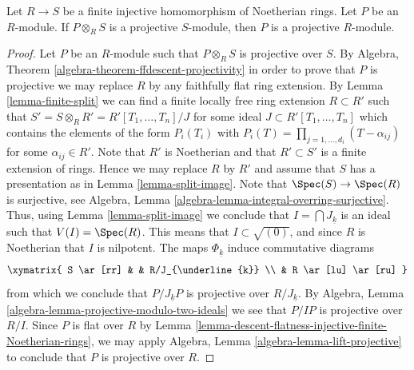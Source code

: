 \begin{lemma}
\label{lemma-descent-projective-injective-finite-Noetherian-rings}
Let $R \to S$ be a finite injective homomorphism of Noetherian rings.
Let $P$ be an $R$-module. If $P \otimes_R S$ is a projective $S$-module,
then $P$ is a projective $R$-module.
\end{lemma}

\begin{proof}
Let $P$ be an $R$-module such that $P \otimes_R S$ is projective over $S$. By
Algebra, Theorem \ref{algebra-theorem-ffdescent-projectivity}
in order to prove that $P$ is projective we may replace $R$
by any faithfully flat ring extension. By
Lemma \ref{lemma-finite-split}
we can find a finite locally free ring extension $R \subset R'$ such
that $S' = S \otimes_R R' = R'[T_1, \ldots, T_n]/J$ for some ideal
$J \subset R'[T_1, \ldots, T_n]$ which contains the  elements of the form
$P_i(T_i)$ with $P_i(T) = \prod_{j = 1, \ldots, d_i} (T - \alpha_{ij})$
for some $\alpha_{ij} \in R'$. Note that $R'$ is Noetherian
and that $R' \subset S'$ is a finite extension of rings. Hence we may
replace $R$ by $R'$ and assume that $S$ has a presentation as in
Lemma \ref{lemma-split-image}.
Note that $\Spec(S) \to \Spec(R)$ is surjective, see
Algebra, Lemma \ref{algebra-lemma-integral-overring-surjective}.
Thus, using Lemma \ref{lemma-split-image}
we conclude that $I = \bigcap J_{\underline{k}}$ is an ideal
such that $V(I) = \Spec(R)$. This means that
$I \subset \sqrt{(0)}$, and since $R$ is Noetherian that $I$
is nilpotent. The maps $\Phi_{\underline{k}}$ induce commutative
diagrams
$$
\xymatrix{
S \ar[rr] & & R/J_{\underline{k}} \\
& R \ar[lu] \ar[ru]
}
$$
from which we conclude that $P/J_{\underline{k}}P$ is projective over
$R/J_{\underline{k}}$. By
Algebra, Lemma \ref{algebra-lemma-projective-modulo-two-ideals}
we see that $P/IP$ is projective over $R/I$. Since $P$ is flat
over $R$ by
Lemma \ref{lemma-descent-flatness-injective-finite-Noetherian-rings},
we may apply Algebra, Lemma \ref{algebra-lemma-lift-projective} to
conclude that $P$ is projective over $R$.
\end{proof}